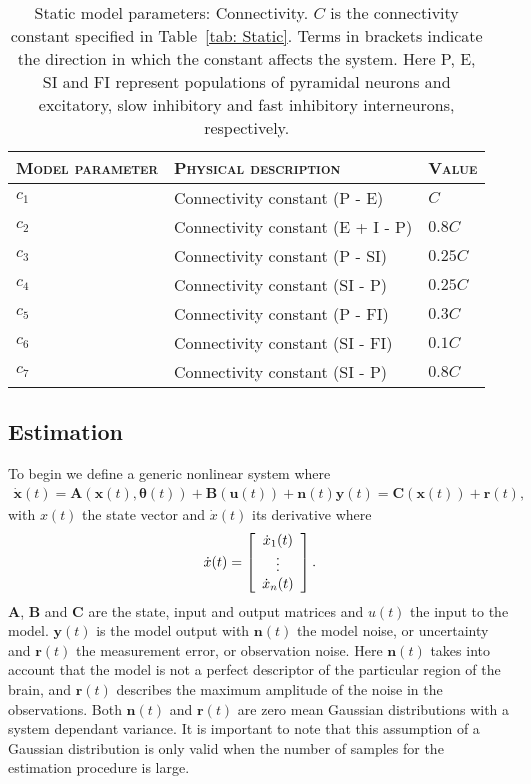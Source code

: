 \begin{center}
	\begin{table}
			\caption[Static Model Parameters: Connectivity]{Static model parameters: Connectivity. $C$ is the connectivity constant specified in Table~\ref{tab: Static}. Terms in brackets indicate the direction in which the constant affects the system. Here P, E, SI and FI represent populations of pyramidal neurons and excitatory, slow inhibitory and fast inhibitory interneurons, respectively.}
		\begin{tabular}{||p{4cm}|p{7cm}|p{2cm}||}\hline
			 \textsc{Model parameter}  & \textsc{Physical description} & \textsc{Value}
			   \\\hline\hline
			 $c_{1}$ & Connectivity constant (P - E) & $C$ \\\hline
			 $c_{2}$ & Connectivity constant (E + I - P) & $0.8C$ \\\hline
			 $c_{3}$ & Connectivity constant (P - SI) & $0.25C$  \\\hline
			 $c_{4}$ & Connectivity constant (SI - P)& $0.25C$ \\\hline
			 $c_{5}$ & Connectivity constant (P - FI) & $0.3C$ \\\hline
			 $c_{6}$ & Connectivity constant (SI - FI) & $0.1C$ \\\hline
			 $c_{7}$ & Connectivity constant (SI - P) & $0.8C$ \\\hline\hline
		\end{tabular}
		\label{tab: Connectivity}
	\end{table}
\end{center}

\subsection{Estimation}

To begin we define a generic nonlinear system where \begin{align}
\mathbf{\dot{x}}(t) = \mathbf{A}(\mathbf{x}(t),\mathbf{\theta}(t)) + \mathbf{B}(\mathbf{u}(t)) + \mathbf{n}(t)
\mathbf{y}(t)  = \mathbf{C}(\mathbf{x}(t)) +\mathbf{r}(t),
\end{align} with $x(t)$ the state vector and $\dot{x}(t)$ its derivative where
\[ \dot{x}(t) = \left[ \begin{array}[pos]{c}
\dot{x}_{1}(t)\\
\vdots \\
\dot{x}_{n}(t) \end{array} \right] .\]  $\mathbf{A}$, $\mathbf{B}$ and $\mathbf{C}$ are the state, input and output matrices and $u(t)$ the input to the model. $\mathbf{y}(t)$ is the model output with $\mathbf{n}(t)$ the model noise, or uncertainty and $\mathbf{r}(t)$ the measurement error, or observation noise. Here $\mathbf{n}(t)$ takes into account that the model is not a perfect descriptor of the particular region of the brain, and $\mathbf{r}(t)$ describes the maximum amplitude of the noise in the observations. Both $\mathbf{n}(t)$ and $\mathbf{r}(t)$ are zero mean Gaussian distributions with a system dependant variance. It is important to note that this assumption of a Gaussian distribution is only valid when the number of samples for the estimation procedure is large.

